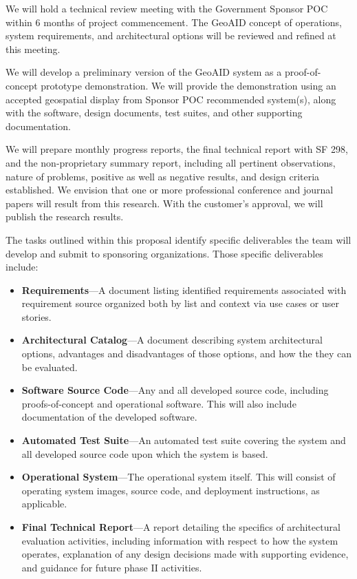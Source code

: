 \documentclass{sbir}
\begin{document}
We will hold a technical review meeting with the Government Sponsor POC within 6 months of project commencement. The GeoAID concept of operations, system requirements, and architectural options will be reviewed and refined at this meeting.

We will develop a preliminary version of the GeoAID system as a proof-of-concept prototype demonstration. We will provide the demonstration using an accepted geospatial display from Sponsor POC recommended system(s), along with the software, design documents, test suites, and other supporting documentation.

We will prepare monthly progress reports, the final technical report with SF 298, and the non-proprietary summary report, including all pertinent observations, nature of problems, positive as well as negative results, and design criteria established. We envision that one or more professional conference and journal papers will result from this research. With the customer's approval, we will publish the research results.

The tasks outlined within this proposal identify specific deliverables the team will develop and submit to sponsoring organizations. Those specific deliverables include:

\begin{itemize}
\item {\bf Requirements}---A document listing identified requirements associated with requirement source organized both by list and context via use cases or user stories.
\item {\bf Architectural Catalog}---A document describing system architectural options, advantages and disadvantages of those options, and how the they can be evaluated.
\item {\bf Software Source Code}---Any and all developed source code, including proofs-of-concept and operational software. This will also include documentation of the developed software.
\item {\bf Automated Test Suite}---An automated test suite covering the system and all developed source code upon which the system is based.
\item {\bf Operational System}---The operational system itself. This will consist of operating system images, source code, and deployment instructions, as applicable.
\item {\bf Final Technical Report}---A report detailing the specifics of architectural evaluation activities, including information with respect to how the system operates, explanation of any design decisions made with supporting evidence, and guidance for future phase II activities.
\end{itemize}
\end{document}
